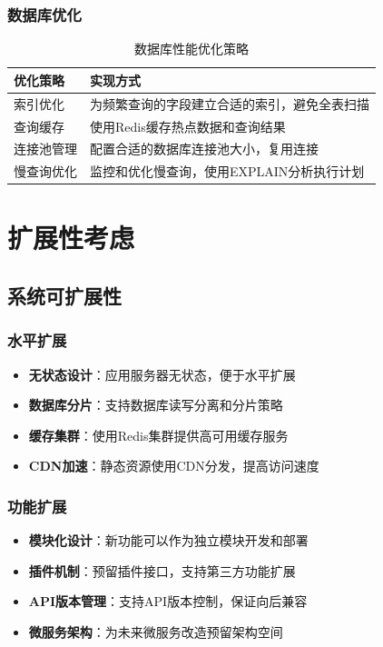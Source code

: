 \documentclass[a4paper]{article}
\begin{document}
\subsubsection{数据库优化}

\begin{table}[H]
\centering
\begin{tabular}{|l|p{8cm}|}
\hline
\textbf{优化策略} & \textbf{实现方式} \\
\hline
索引优化 & 为频繁查询的字段建立合适的索引，避免全表扫描 \\
\hline
查询缓存 & 使用Redis缓存热点数据和查询结果 \\
\hline
连接池管理 & 配置合适的数据库连接池大小，复用连接 \\
\hline
慢查询优化 & 监控和优化慢查询，使用EXPLAIN分析执行计划 \\
\hline
\end{tabular}
\caption{数据库性能优化策略}
\end{table}

\section{扩展性考虑}

\subsection{系统可扩展性}

\subsubsection{水平扩展}

\begin{itemize}
    \item \textbf{无状态设计}：应用服务器无状态，便于水平扩展
    \item \textbf{数据库分片}：支持数据库读写分离和分片策略
    \item \textbf{缓存集群}：使用Redis集群提供高可用缓存服务
    \item \textbf{CDN加速}：静态资源使用CDN分发，提高访问速度
\end{itemize}

\subsubsection{功能扩展}

\begin{itemize}
    \item \textbf{模块化设计}：新功能可以作为独立模块开发和部署
    \item \textbf{插件机制}：预留插件接口，支持第三方功能扩展
    \item \textbf{API版本管理}：支持API版本控制，保证向后兼容
    \item \textbf{微服务架构}：为未来微服务改造预留架构空间
\end{itemize}
\end{document}
